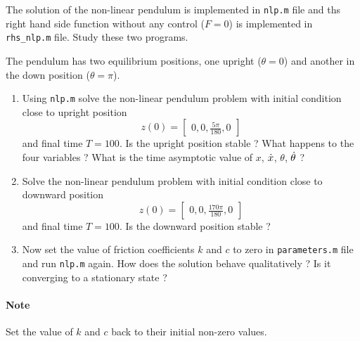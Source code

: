 \documentclass[12pt]{article}
\begin{document}
The solution of the non-linear pendulum is implemented in {\tt nlp.m} file and ths right hand side function without any control ($F=0$) is implemented in {\tt rhs\_nlp.m} file. Study these two programs.

The pendulum has two equilibrium positions, one upright ($\theta=0$) and another in the down position ($\theta=\pi$).
\begin{enumerate}
\item Using {\tt nlp.m} solve the non-linear pendulum problem with initial condition close to upright position 
\[
z(0) = \begin{bmatrix} 0, 0, \frac{5\pi}{180}, 0 \end{bmatrix}
\]
and final time $T=100$. Is the upright position stable ? What happens to the four variables ? What is the time asymptotic value of $x$, $\dot{x}$, $\theta$, $\dot{\theta}$ ?

\item Solve the non-linear pendulum problem with initial condition close to downward position
\[
z(0) = \begin{bmatrix} 0, 0, \frac{170\pi}{180}, 0 \end{bmatrix}
\]
and final time $T=100$. Is the downward position stable ?

\item Now set the value of friction coefficients $k$ and $c$ to zero in {\tt parameters.m} file and run {\tt nlp.m} again. How does the solution behave qualitatively ? Is it converging to a stationary state ?

\end{enumerate}

\paragraph{Note} Set the value of $k$ and $c$ back to their initial non-zero values.

\end{document}
